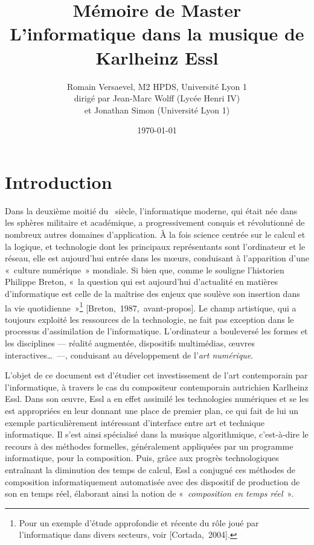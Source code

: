 \documentclass[a4paper,12pt]{article}
\title{\Large Mémoire de Master \\ \LARGE L'informatique dans la musique de Karlheinz Essl}
\author{\normalsize Romain Versaevel, M2 HPDS, Université Lyon 1\\
\normalsize dirigé par Jean-Marc Wolff (Lycée Henri IV) \\
\normalsize et Jonathan Simon (Université Lyon 1)}
\date{\today}
\newcommand{\guill}[1]{«~#1~»}
\newcommand{\cicite}[1]{{\footnotesize[#1]}}
\begin{document}
\maketitle
\newpage

\tableofcontents

\newpage

\section{Introduction}

Dans la deuxième moitié du \XXe~siècle, l'informatique moderne, qui était née dans les sphères militaire et académique, a progressivement conquis et révolutionné de nombreux autres domaines d'application. À la fois science centrée sur le calcul et la logique, et technologie dont les principaux représentants sont l'ordinateur et le réseau, elle est aujourd'hui entrée dans les mœurs, conduisant à l'apparition d'une \guill{culture numérique} mondiale. Si bien que, comme le souligne l'historien Philippe Breton, \guill{la question qui est aujourd’hui d'actualité en matières d'informatique est celle de la maîtrise des enjeux que soulève son insertion dans la vie quotidienne}\footnote{Pour un exemple d'étude approfondie et récente du rôle joué par l'informatique dans divers secteurs, voir \cicite{Cortada,~2004}.} \cicite{Breton,~1987,~avant-propos}. Le champ artistique, qui a toujours exploité les ressources de la technologie, ne fait pas exception dans le processus d'assimilation de l'informatique. L'ordinateur a bouleversé les formes et les disciplines --- réalité augmentée, dispositifs multimédias, œuvres interactives\dots~---, conduisant au développement de l'\emph{art numérique}.

L'objet de ce document est d'étudier cet investissement de l'art contemporain par l'informatique, à travers le cas du compositeur contemporain autrichien Karlheinz Essl. Dans son œuvre, Essl a en effet assimilé les technologies numériques et se les est appropriées en leur donnant une place de premier plan, ce qui fait de lui un exemple particulièrement intéressant d'interface entre art et technique informatique. Il s'est ainsi spécialisé dans la musique algorithmique, c'est-à-dire le recours à des méthodes formelles, généralement appliquées par un programme informatique, pour la composition. Puis, grâce aux progrès technologiques entraînant la diminution des temps de calcul, Essl a conjugué ces méthodes de composition informatiquement automatisée avec des dispositif de production de son en temps réel, élaborant ainsi la notion de \guill{\emph{composition en temps réel}}.
\end{document}
